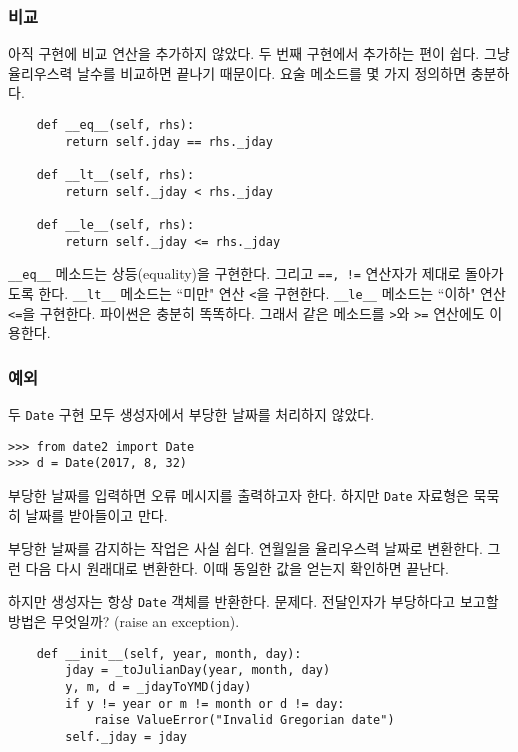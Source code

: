 \documentclass[a4paper]{oblivoir}
\begin{document}
\subsubsection*{비교}

아직 구현에 비교 연산을 추가하지 않았다. 두 번째 구현에서 추가하는 편이 쉽다. 그냥 율리우스력 날수를 비교하면 끝나기 때문이다. 요술 메소드를 몇 가지 정의하면 충분하다.

\begin{verbatim}
    def __eq__(self, rhs):
        return self.jday == rhs._jday
    
    def __lt__(self, rhs):
        return self._jday < rhs._jday
    
    def __le__(self, rhs):
        return self._jday <= rhs._jday
\end{verbatim}

\noindent\texttt{\_\_eq\_\_} 메소드는 상등(equality)을 구현한다. 그리고 \texttt{==, !=} 연산자가 제대로 돌아가도록 한다. \texttt{\_\_lt\_\_} 메소드는 ``미만" 연산 \texttt{<}을 구현한다. \texttt{\_\_le\_\_} 메소드는 ``이하" 연산 \texttt{<=}을 구현한다. 파이썬은 충분히 똑똑하다. 그래서 같은 메소드를 \texttt{>}와 \texttt{>=} 연산에도 이용한다. 

\subsubsection*{예외}

두 \texttt{Date} 구현 모두 생성자에서 부당한 날짜를 처리하지 않았다. 

\begin{lstlisting}
>>> from date2 import Date
>>> d = Date(2017, 8, 32)
\end{lstlisting}

 부당한 날짜를 입력하면 오류 메시지를 출력하고자 한다. 하지만 \texttt{Date} 자료형은 묵묵히 날짜를 받아들이고 만다.

부당한 날짜를 감지하는 작업은 사실 쉽다. 연월일을 율리우스력 날짜로 변환한다. 그런 다음 다시 원래대로 변환한다. 이때 동일한 값을 얻는지 확인하면 끝난다.

하지만 생성자는 항상 \texttt{Date} 객체를 반환한다. 문제다. 전달인자가 부당하다고 보고할 방법은 무엇일까? (raise an exception).

\begin{verbatim}
    def __init__(self, year, month, day):
        jday = _toJulianDay(year, month, day)
        y, m, d = _jdayToYMD(jday)
        if y != year or m != month or d != day:
            raise ValueError("Invalid Gregorian date")
        self._jday = jday
\end{verbatim}
\end{document}
